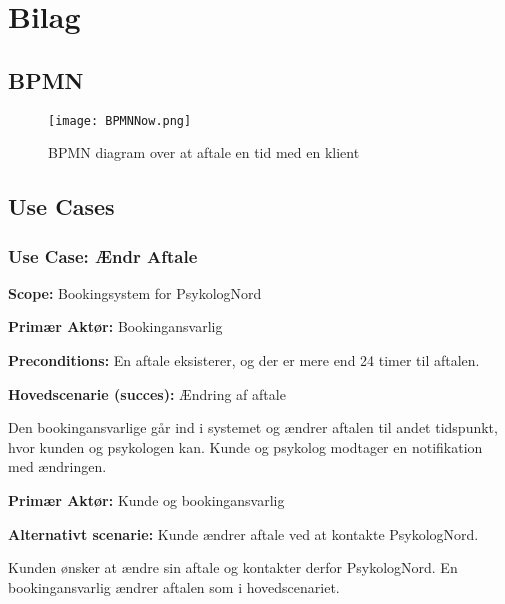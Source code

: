 \newpage
\section{Bilag}

\subsection{BPMN}

\begin{figure}[h]
    \caption{BPMN diagram over at aftale en tid med en klient}
    \centering
        \texttt{[image: BPMNNow.png]}
        \label{bilag:bpmnnow}
\end{figure}

\subsection{Use Cases}
\label{bilag:UseCases}
\subsubsection*{Use Case: Ændr Aftale}
{\setlength{\parindent}{0cm}
\textbf{Scope:} Bookingsystem for PsykologNord

\textbf{Primær Aktør:} Bookingansvarlig 

\textbf{Preconditions:} En aftale eksisterer, og der er mere end 24 timer til aftalen.

\textbf{Hovedscenarie (succes):} Ændring af aftale

Den bookingansvarlige går ind i systemet og ændrer aftalen til andet tidspunkt, hvor kunden og psykologen kan.
Kunde og psykolog modtager en notifikation med ændringen.

\textbf{Primær Aktør:} Kunde og bookingansvarlig

\textbf{Alternativt scenarie:} Kunde ændrer aftale ved at kontakte PsykologNord.

Kunden ønsker at ændre sin aftale og kontakter derfor PsykologNord.
En bookingansvarlig ændrer aftalen som i hovedscenariet.
}

